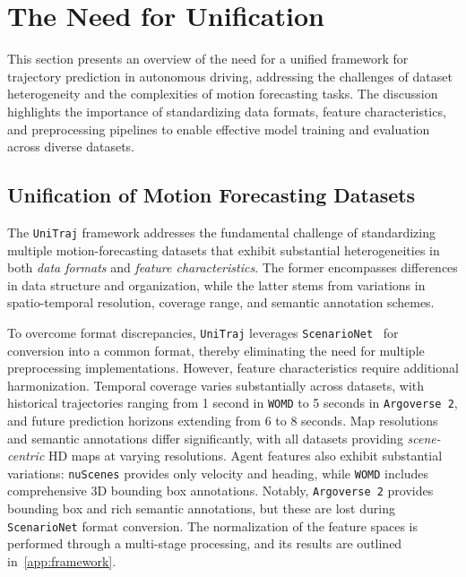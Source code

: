 \section{The Need for Unification}
\label{ch:data_methodology}

This section presents an overview of the need for a unified framework for trajectory prediction in autonomous driving, addressing the challenges of dataset heterogeneity and the complexities of motion forecasting tasks. The discussion highlights the importance of standardizing data formats, feature characteristics, and preprocessing pipelines to enable effective model training and evaluation across diverse datasets.

\subsection{Unification of Motion Forecasting Datasets}
\label{sec:data_datasets}

The \texttt{UniTraj} framework addresses the fundamental challenge of standardizing multiple motion-forecasting datasets that exhibit substantial heterogeneities in both \emph{data formats} and \emph{feature characteristics}.
The former encompasses differences in data structure and organization, while the latter stems from variations in
spatio-temporal resolution, coverage range, and semantic annotation schemes.

To overcome format discrepancies, \texttt{UniTraj} leverages \texttt{ScenarioNet}~\cite{scenarionetLi2023} for conversion into a common
format, thereby eliminating the need for multiple preprocessing implementations. However, feature characteristics require additional harmonization. Temporal coverage varies substantially
across datasets, with historical trajectories ranging from 1 second in \texttt{WOMD}\cite{wmodSun2020} to 5 seconds in \texttt{Argoverse 2}\cite{av2Wilson2023},
and future prediction horizons extending from 6 to 8 seconds. Map resolutions and semantic annotations differ
significantly, with all datasets providing \emph{scene-centric} HD maps at varying resolutions.
Agent features also exhibit substantial variations: \texttt{nuScenes} provides only velocity and heading, while
\texttt{WOMD} includes comprehensive 3D bounding box annotations. Notably, \texttt{Argoverse 2} provides bounding
box and rich semantic annotations, but these are lost during \texttt{ScenarioNet} format conversion.
The normalization of the feature spaces is performed through a multi-stage processing, and its results are outlined in~\autoref{app:framework}.


